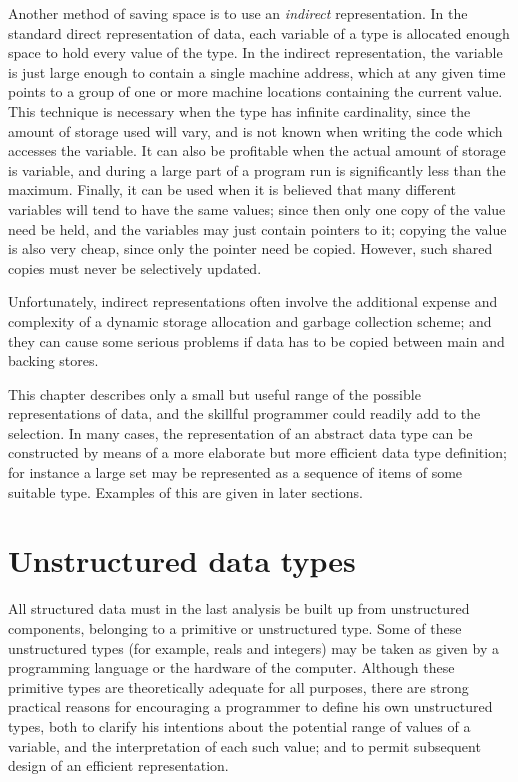 Another method of saving space is to use an \textit{indirect} representation. In the standard direct representation of data, each variable of a type is allocated enough space to hold every value of the type. In the indirect representation, the variable is just large enough to contain a single machine address, which at any given time points to a group of one or more machine locations containing the current value. This technique is necessary when the type has infinite cardinality, since the amount of storage used will vary, and is not known when writing the code which accesses the variable. It can also be profitable when the actual amount of storage is variable, and during a large part of a program run is significantly less than the maximum. Finally, it can be used when it is believed that many different variables will tend to have the same values; since then only one copy of the value need be held, and the variables may just contain pointers to it; copying the value is also very cheap, since only the pointer need be copied. However, such shared copies must never be selectively updated.

Unfortunately, indirect representations often involve the additional expense and complexity of a dynamic storage allocation and garbage collection scheme; and they can cause some serious problems if data has to be copied between main and backing stores.

This chapter describes only a small but useful range of the possible representations of data, and the skillful programmer could readily add to the selection. In many cases, the representation of an abstract data type can be constructed by means of a more elaborate but more efficient data type definition; for instance a large set may be represented as a sequence of items of some suitable type. Examples of this are given in later sections.

\section{Unstructured data types}

All structured data must in the last analysis be built up from unstructured components, belonging to a primitive or unstructured type. Some of these unstructured types (for example, reals and integers) may be taken as given by a programming language or the hardware of the computer. Although these primitive types are theoretically adequate for all purposes, there are strong practical reasons for encouraging a programmer to define his own unstructured types, both to clarify his intentions about the potential range of values of a variable, and the interpretation of each such value; and to permit subsequent design of an efficient representation.

